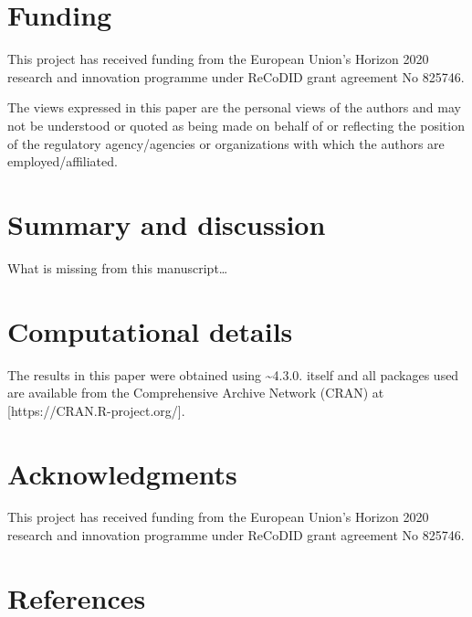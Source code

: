 \documentclass[
  article]{jss}
\begin{document}
\hypertarget{funding}{%
\section{Funding}\label{funding}}

This project has received funding from the European Union's Horizon 2020
research and innovation programme under ReCoDID grant agreement No
825746.

The views expressed in this paper are the personal views of the authors
and may not be understood or quoted as being made on behalf of or
reflecting the position of the regulatory agency/agencies or
organizations with which the authors are employed/affiliated.

\hypertarget{sec-summary}{%
\section{Summary and discussion}\label{sec-summary}}

What is missing from this manuscript\ldots{}

\hypertarget{computational-details}{%
\section*{Computational details}\label{computational-details}}

The results in this paper were obtained using
\textasciitilde4.3.0.  itself and all packages
used are available from the Comprehensive  Archive Network
(CRAN) at {[}https://CRAN.R-project.org/{]}.

\hypertarget{acknowledgments}{%
\section*{Acknowledgments}\label{acknowledgments}}

This project has received funding from the European Union's Horizon 2020
research and innovation programme under ReCoDID grant agreement No
825746.

\hypertarget{references}{%
\section*{References}\label{references}}

\renewcommand{\bibsection}{}

\end{document}
